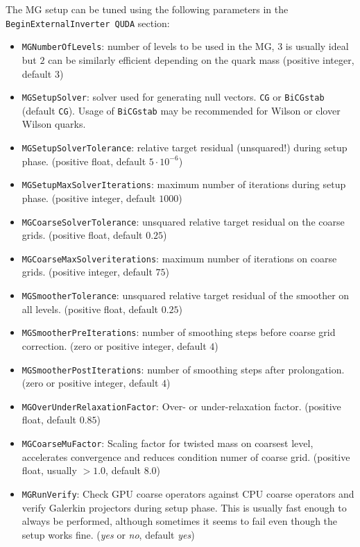 The MG setup can be tuned using the following parameters in the \texttt{BeginExternalInverter QUDA} section:
\begin{itemize}
  \item{ \texttt{MGNumberOfLevels}: number of levels to be used in the MG, $3$ is usually ideal but $2$ can be similarly efficient depending on the quark mass (positive integer, default $3$) }
  \item{ \texttt{MGSetupSolver}: solver used for generating null vectors. \texttt{CG} or \texttt{BiCGstab} (default \texttt{CG}). Usage of \texttt{BiCGstab} may be recommended for Wilson or clover Wilson quarks. }
  \item{ \texttt{MGSetupSolverTolerance}: relative target residual (unsquared!) during setup phase. (positive float, default $5\cdot10^{-6}$) }
  \item{ \texttt{MGSetupMaxSolverIterations}: maximum number of iterations during setup phase. (positive integer, default $1000$) }
  \item{ \texttt{MGCoarseSolverTolerance}: unsquared relative target residual on the coarse grids. (positive float, default $0.25$) }
  \item{ \texttt{MGCoarseMaxSolveriterations}: maximum number of iterations on coarse grids. (positive integer, default $75$) }
  \item{ \texttt{MGSmootherTolerance}: unsquared relative target residual of the smoother on all levels. (positive float, default $0.25$) }
  \item{ \texttt{MGSmootherPreIterations}: number of smoothing steps before coarse grid correction. (zero or positive integer, default $4$)}
  \item{ \texttt{MGSmootherPostIterations}: number of smoothing steps after prolongation. (zero or positive integer, default $4$)}
  \item{ \texttt{MGOverUnderRelaxationFactor}: Over- or under-relaxation factor. (positive float, default $0.85$)}
  \item{ \texttt{MGCoarseMuFactor}: Scaling factor for twisted mass on coarsest level, accelerates convergence and reduces condition numer of coarse grid. (positive float, usually $ > 1.0$, default $8.0$)}
  \item{ \texttt{MGRunVerify}: Check GPU coarse operators against CPU coarse operators and verify Galerkin projectors during setup phase. This is usually fast enough to always be performed, although sometimes it seems to fail even though the setup works fine. (\emph{yes} or \emph{no}, default \emph{yes}) } 
\end{itemize}

